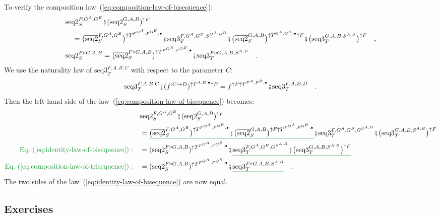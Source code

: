 To verify the composition law~(\ref{eq:composition-law-of-bisequence}):
\begin{align*}
 & \text{seq2}_{S}^{F,G^{A},G^{B}}\bef(\text{seq2}_{S}^{G,A,B})^{\uparrow F}\\
 & \quad=\big(\overline{\text{seq2}}_{S}^{F,G^{A},G^{B}}\big)^{\uparrow T^{F^{G^{A}},F^{G^{B}},\bullet}}\bef\text{seq3}_{T}^{F,G^{A},G^{B},S^{G^{A},G^{B}}}\bef\big(\overline{\text{seq2}}_{S}^{G,A,B}\big)^{\uparrow T^{G^{A},G^{B},\bullet}\uparrow F}\bef\big(\text{seq3}_{T}^{G,A,B,S^{A,B}}\big)^{\uparrow F}\quad,\\
 & \text{seq2}_{S}^{F\circ G,A,B}=\big(\overline{\text{seq2}}_{S}^{F\circ G,A,B}\big)^{\uparrow T^{F^{G^{A}},F^{G^{B}},\bullet}}\bef\text{seq3}_{T}^{F\circ G,A,B,S^{A,B}}\quad.
\end{align*}
We use the naturality law of $\text{seq3}_{T}^{F,A,B,C}$ with respect
to the parameter $C$:
\[
\text{seq3}_{T}^{F,A,B,C}\bef(f^{:C\rightarrow D})^{\uparrow T^{A,B,\bullet}\uparrow F}=f^{\uparrow F\uparrow T^{F^{A},F^{B},\bullet}}\bef\text{seq3}_{T}^{F,A,B,D}\quad.
\]
Then the left-hand side of the law~(\ref{eq:composition-law-of-bisequence})
becomes:
\begin{align*}
 & \text{seq2}_{S}^{F,G^{A},G^{B}}\bef(\text{seq2}_{S}^{G,A,B})^{\uparrow F}\\
 & =\gunderline{\big(\overline{\text{seq2}}_{S}^{F,G^{A},G^{B}}\big)^{\uparrow T^{F^{G^{A}},F^{G^{B}},\bullet}}\bef\big(\overline{\text{seq2}}_{S}^{G,A,B}\big)^{\uparrow F\uparrow T^{F^{G^{A}},F^{G^{B}},\bullet}}}\bef\text{seq3}_{T}^{F,G^{A},G^{B},G^{S^{A,B}}}\bef\big(\text{seq3}_{T}^{G,A,B,S^{A,B}}\big)^{\uparrow F}\\
{\color{greenunder}\text{Eq.~(\ref{eq:identity-law-of-bisequence})}:}\quad & =(\text{seq2}_{S}^{F\circ G,A,B})^{\uparrow T^{F^{G^{A}},F^{G^{B}},\bullet}}\bef\gunderline{\text{seq3}_{T}^{F,G^{A},G^{B},G^{S^{A,B}}}\bef\big(\text{seq3}_{T}^{G,A,B,S^{A,B}}\big)^{\uparrow F}}\\
{\color{greenunder}\text{Eq.~(\ref{eq:composition-law-of-trisequence})}:}\quad & =(\text{seq2}_{S}^{F\circ G,A,B})^{\uparrow T^{F^{G^{A}},F^{G^{B}},\bullet}}\bef\gunderline{\text{seq3}_{T}^{F\circ G,A,B,S^{A,B}}}\quad.
\end{align*}
The two sides of the law~(\ref{eq:identity-law-of-bisequence}) are
now equal.

\subsection{Exercises}

